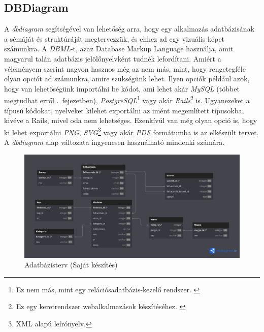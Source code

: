 \documentclass[]{thesis-ekf}
\theoremstyle{definition}
\theoremstyle{remark}
\begin{document}
	\subsection{DBDiagram}
	A \emph{dbdiagram} segítségével van lehetőség arra, hogy egy alkalmazás adatbázisának a sémáját és struktúráját megtervezzük, és ehhez ad egy vizuális képet számunkra. A \emph{DBML}-t, azaz Database Markup Language használja, amit magyarul talán adatbázis jelölőnyelvként tudnék lefordítani. Amiért a véleményem szerint nagyon hasznos még az nem más, mint, hogy rengetegféle olyan opciót ad számunkra, amire szükségünk lehet. Ilyen opciók például azok, hogy van lehetőségünk importálni be kódot, ami lehet akár \emph{MySQL} (többet megtudhat erről .~fejezetben), \emph{PostgreSQL}\footnote{Ez nem más, mint egy relációsadatbázis-kezelő rendszer. \cite{PostgreSQL}} vagy akár \emph{Rails}\footnote{Ez egy keretrendszer webalkalmazások készítéséhez. \cite{Rails}} is. Ugyanezeket a típusú kódokat, nyelveket kilehet exportálni az imént megemlített típusokba, kivéve a Rails, mivel oda nem lehetséges. Ezenkívül van még olyan opció is, hogy ki lehet exportálni \emph{PNG}, \emph{SVG}\footnote{XML alapú leírónyelv.} vagy akár \emph{PDF} formátumba is az elkészült tervet. A \emph{dbdiagram} alap változata ingyenesen használható mindenki számára. \cite{Dbdiagram}
	
	\begin{figure}[ht!]
		\centering
		\includegraphics[width=15cm]{./tervezes/dbdiagram}
		\caption{Adatbázisterv (Saját készítés)} 
		\label{dbdiagram}
	\end{figure}
	
\end{document}
